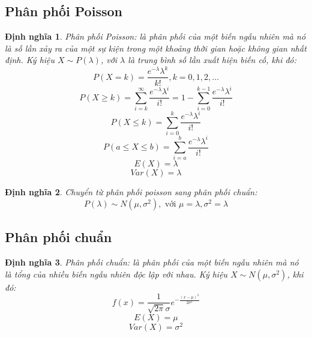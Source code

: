 \documentclass[12pt]{article}
\newtheorem{thm}{Định nghĩa}
\begin{document}
\subsection{Phân phối Poisson}
\begin{thm}
    Phân phối Poisson: là phân phối của một biến ngẫu nhiên mà nó là số lần xảy ra của một sự kiện trong một khoảng thời gian hoặc không gian nhất định. Ký hiệu $X \sim P(\lambda)$, với $\lambda$ là trung bình số lần xuất hiện biến cố, khi đó:
    \begin{equation}
        P(X = k) = \frac{e^{-\lambda}\lambda^k}{k!}, k = 0, 1, 2, \dots
    \end{equation}
    \begin{equation}
        P(X \geq k) = \sum_{i=k}^{\infty} \frac{e^{-\lambda}\lambda^i}{i!} = 1 - \sum_{i=0}^{k-1} \frac{e^{-\lambda}\lambda^i}{i!}
    \end{equation}
    \begin{equation}
        P(X \leq k) = \sum_{i=0}^{k} \frac{e^{-\lambda}\lambda^i}{i!}
    \end{equation}
    \begin{equation}
        P(a \leq X \leq b) = \sum_{i=a}^{b} \frac{e^{-\lambda}\lambda^i}{i!}
    \end{equation}
    \begin{equation}
        E(X) = \lambda
    \end{equation}
    \begin{equation}
        Var(X) = \lambda
    \end{equation}
\end{thm}
\begin{thm}
    Chuyển từ phân phối poisson sang phân phối chuẩn:
    \begin{equation}
    P(\lambda) \sim N(\mu, \sigma^2), \text{ với } \mu = \lambda, \sigma^2 = \lambda
    \end{equation}

\end{thm}

\subsection{Phân phối chuẩn}
\begin{thm}
    Phân phối chuẩn: là phân phối của một biến ngẫu nhiên mà nó là tổng của nhiều biến ngẫu nhiên độc lập với nhau. Ký hiệu $X \sim N(\mu, \sigma^2)$, khi đó:
    \begin{equation}
        f(x) = \frac{1}{\sqrt{2\pi}\sigma}e^{-\frac{(x - \mu)^2}{2\sigma^2}}
    \end{equation}
    \begin{equation}
        E(X) = \mu
    \end{equation}
    \begin{equation}
        Var(X) = \sigma^2
    \end{equation}
\end{thm}
\end{document}
